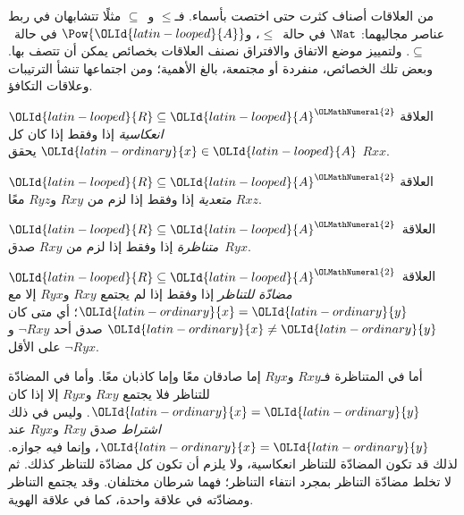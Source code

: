 \documentclass[../../../include/open-logic-section]{subfiles}
\begin{document}

\begin{intro}
من العلاقات أصناف كثرت حتى اختصت بأسماء. فـ$\le$ و~$\subseteq$
مثلًا تتشابهان في ربط عناصر مجاليهما: $\Nat$ في حالة~$\le$،
و$\Pow{\OLId{latin-looped}{A}}$ في حالة~$\subseteq$. ولتمييز موضع الاتفاق والافتراق
نصنف العلاقات بخصائص يمكن أن تتصف بها. وبعض تلك الخصائص، منفردة
أو مجتمعة، بالغ الأهمية؛ ومن اجتماعها تنشأ الترتيبات وعلاقات التكافؤ.
\end{intro}

\begin{defn}[الانعكاسية]
العلاقة $\OLId{latin-looped}{R} \subseteq \OLId{latin-looped}{A}^\OLMathNumeral{2}$ \emph{انعكاسية} إذا وفقط إذا كان كل $\OLId{latin-ordinary}{x} \in
\OLId{latin-looped}{A}$ يحقق $Rxx$.
\end{defn}

\begin{defn}[التعدية]
العلاقة $\OLId{latin-looped}{R} \subseteq \OLId{latin-looped}{A}^\OLMathNumeral{2}$ \emph{متعدية} إذا وفقط إذا لزم من $Rxy$
و$Ryz$ معًا $Rxz$.
\end{defn}

\begin{defn}[التناظر]
العلاقة~$\OLId{latin-looped}{R} \subseteq \OLId{latin-looped}{A}^\OLMathNumeral{2}$ \emph{متناظرة} إذا وفقط إذا لزم من
$Rxy$ صدق~$Ryx$.
\end{defn}

\begin{defn}
العلاقة~$\OLId{latin-looped}{R} \subseteq \OLId{latin-looped}{A}^\OLMathNumeral{2}$ \emph{مضادّة\- للتناظر\-} إذا وفقط إذا لم
يجتمع $Rxy$ و$Ryx$ إلا مع $\OLId{latin-ordinary}{x}=\OLId{latin-ordinary}{y}$؛ أي متى كان $\OLId{latin-ordinary}{x}\neq \OLId{latin-ordinary}{y}$ صدق أحد
$\lnot Rxy$ و$\lnot Ryx$ على الأقل.
\end{defn}

\begin{explain}
أما في المتناظرة فـ$Rxy$ و$Ryx$ إما صادقان معًا وإما كاذبان معًا.
وأما في المضادّة للتناظر فلا يجتمع $Rxy$ و$Ryx$ إلا إذا كان
$\OLId{latin-ordinary}{x} = \OLId{latin-ordinary}{y}$. وليس في ذلك \emph{اشتراط} صدق $Rxy$ و$Ryx$ عند $\OLId{latin-ordinary}{x} = \OLId{latin-ordinary}{y}$،
وإنما فيه جوازه. لذلك قد تكون المضادّة للتناظر انعكاسية، ولا يلزم
أن تكون كل مضادّة للتناظر كذلك. ثم لا تخلط مضادّة التناظر بمجرد
انتفاء التناظر؛ فهما شرطان مختلفان. وقد يجتمع التناظر ومضادّته
في علاقة واحدة، كما في علاقة الهوية.
\end{explain}
\end{document}
